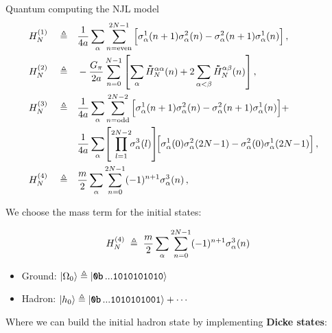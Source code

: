 \begin{frame}[allowframebreaks]{Quantum computing the NJL model}
  \begin{align*}
    H_{N}^{(1)} \quad\defeq\quad&
      \frac{1}{4a} \sum_\alpha \sum_{n=\text{even}}^{2N-1}
      \qty[
        \sigma_\alpha^{1}(n+1) \sigma_\alpha^{2}(n) -
        \sigma_\alpha^{2}(n+1) \sigma_\alpha^{1}(n)
      ] \qc\\
    H_{N}^{(2)} \quad\defeq\quad& - \frac{G_{\pi}}{2a} \sum_{n=0}^{N-1} \qty[
      \sum_{\alpha} \dbtilde{H}_{N}^{\alpha\alpha}(n) + 2
      \sum_{\alpha < \beta} \dbtilde{H}_{N}^{\alpha\beta}(n)] \qc\\
    H_{N}^{(3)} \quad\defeq\quad&
      \frac{1}{4a} \sum_\alpha \sum_{n=\text{odd}}^{2N-2}
      \qty[
        \sigma_\alpha^{1}(n+1) \sigma_\alpha^{2}(n) -
        \sigma_\alpha^{2}(n+1) \sigma_\alpha^{1}(n)
      ] + \nonumber\\&
      \frac{1}{4a} \sum_\alpha \!
      \qty[\prod_{l=1}^{2N-2} \!\! \sigma_\alpha^3(l)] \!
      \qty[
        \sigma_\alpha^{1}(0) \sigma_\alpha^{2}(2N \!-\! 1) -
        \sigma_\alpha^{2}(0) \sigma_\alpha^{1}(2N \!-\! 1)
      ] \qc\\
    H_{N}^{(4)} \quad\defeq\quad&
      \frac{m}{2} \sum_\alpha \sum_{n=0}^{2N-1}
      (-1)^{n+1}\sigma_\alpha^{3}(n) \qc
  \end{align*}

\break

  \begin{minipage}[c]{\linewidth}\begin{multicols}{2}

    We choose the mass term for the initial states:

    \begin{gather*}
      H_{N}^{(4)} \;\triangleq\;
        \frac{m}{2} \sum_\alpha \sum_{n=0}^{2N-1}
        (-1)^{n+1}\sigma_\alpha^{3}(n)
    \end{gather*}

    \begin{itemize}
      \item<1-> Ground: $\ket{\Omega_0} \defeq \ket{\bin...1010101010}$
      \item<1-> Hadron: $\ket{h_0} \defeq \ket{\bin...1010101001} + \cdots$
    \end{itemize}

    Where we can build the initial hadron state by implementing \textbf{Dicke states}:


\end{multicols}
\end{minipage}
\end{frame}
